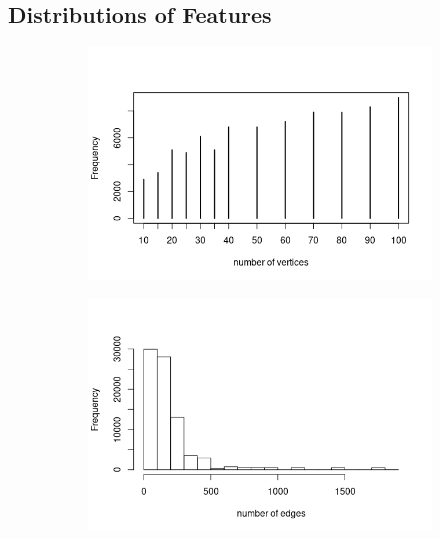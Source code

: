 \documentclass{article}
\theoremstyle{definition}
\theoremstyle{remark}
\begin{document}
\subsection{Distributions of Features}

\begin{figure}
  \centering
  \begin{subfigure}[t]{0.49\textwidth}
    \centering
    \includegraphics[width=\textwidth]{mcs_vertices.png}
  \end{subfigure}
  \begin{subfigure}[t]{0.49\textwidth}
    \centering
    \includegraphics[width=\textwidth]{mcs_edges.png}
  \end{subfigure}
  \begin{subfigure}[t]{0.49\textwidth}
    \centering

\end{subfigure}
\end{figure}
\end{document}
